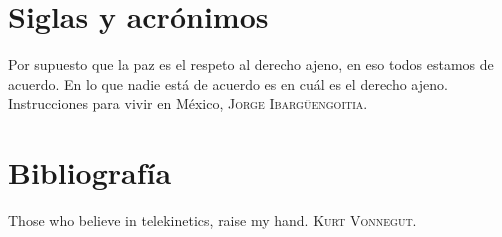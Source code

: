 \documentclass[11pt, letterpaper, twosides]{book}
\begin{document}
  \renewcommand{\capitulo}[3]
  {
    \chapter*{#1}
    \label{#2}
    #3
    \newpage
  }


  \printglossary[
    type=main,
    entrycounter=true
  ]

  \capitulo{Siglas y acrónimos}{sec:siglas}
  {
    \epigrafe
    {%
      Por supuesto que la paz es el respeto al derecho ajeno, en eso todos
      estamos de acuerdo. En lo que nadie está de acuerdo es en cuál es el
      derecho ajeno.%
    }
    {%
      Instrucciones para vivir en México,
      \textsc{Jorge Ibargüengoitia}.%
    }
  }

  \renewcommand*{\glsgroupskip}{}

  \printglossary[
    type=siglas_cripto,
    title={Criptográficos}
  ]

  \printglossary[
    type=siglas_computacionales,
    title={Computacionales}
  ]

  \printglossary[
    type=siglas_bancarias,
    title={Bancarios}
  ]

  \printglossary[
    type=siglas_instituciones,
    title={De instituciones y asociaciones}
  ]


  \capitulo{Bibliografía}{sec:referencias}
  {
    \epigrafe
    {%
      Those who believe in telekinetics, raise my hand.%
    }
    {%
      \textsc{Kurt Vonnegut}.%
    }
  }
  \printbibliography[
    heading=none,
    title={Bibliografía}
  ]

  \newpage
  \listoffigures

  \newpage
  \listoftables

  \newpage
  \lstlistoflistings

\end{document}
